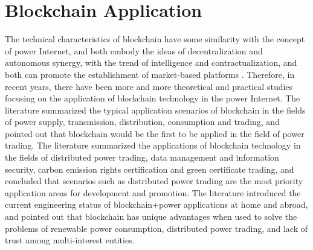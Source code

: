\section{Blockchain Application}
The technical characteristics of blockchain have some similarity with the concept of power Internet, and both embody the ideas of decentralization and autonomous synergy, with the trend of intelligence and contractualization, and both can promote the establishment of market-based platforms \cite{Nofer2017}. Therefore, in recent years, there have been more and more theoretical and practical studies focusing on the application of blockchain technology in the power Internet. The literature \cite{summaryblockchian2019} summarized the typical application scenarios of blockchain in the fields of power supply, transmission, distribution, consumption and trading, and pointed out that blockchain would be the first to be applied in the field of power trading. The literature \cite{blockchainapplication2021} summarized the applications of blockchain technology in the fields of distributed power trading, data management and information security, carbon emission rights certification and green certificate trading, and concluded that scenarios such as distributed power trading are the most priority application areas for development and promotion. The literature \cite{Thu2020} introduced the current engineering status of blockchain+power applications at home and abroad, and pointed out that blockchain has unique advantages when used to solve the problems of renewable power consumption, distributed power trading, and lack of trust among multi-interest entities.





